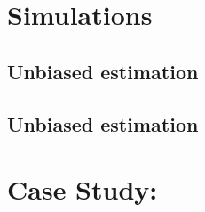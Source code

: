 \documentclass[11pt]{amsart}
\begin{document}
\section{Simulations}

\subsection{Unbiased estimation}

\subsection{Unbiased estimation}

\section{Case Study: }



\end{document}
